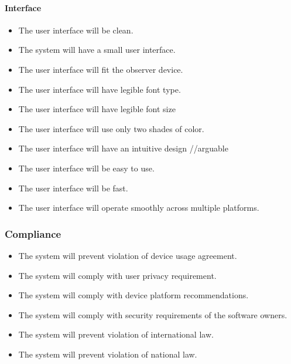     \paragraph{Interface}
        \begin{itemize}
            \item The user interface will be clean.
            \item The system will have a small user interface.
            \item The user interface will fit the observer device.
            \item The user interface will have legible font type.
            \item The user interface will have legible font size
            \item The user interface will use only two shades of color.
            \item The user interface will have an intuitive design //arguable
            \item The user interface will be easy to use.
            \item The user interface will be fast.
            \item The user interface will operate smoothly across multiple platforms.

        \end{itemize}
\subsubsection{Compliance}
		\begin{itemize}
		     \item The system will prevent violation of device usage agreement.
             \item The system will comply with user privacy requirement.
             \item The system will comply with device platform recommendations.
             \item The system will comply with security requirements of the software owners.
             \item The system will prevent violation of international law.
             \item The system will prevent violation of national law.

	    \end{itemize}
